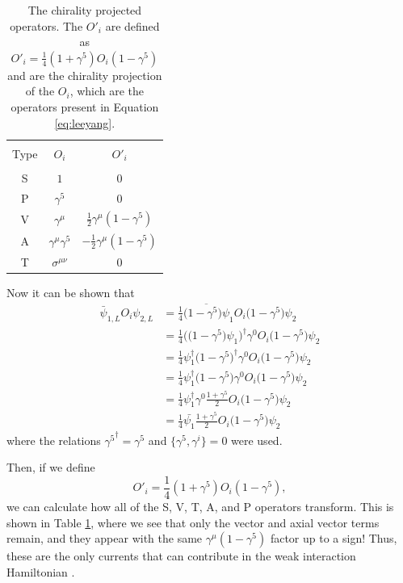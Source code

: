 \begin{table}[h]
  \caption{The chirality projected operators. The $O'_i$ are defined as $O'_i = \frac{1}{4}(1+\gamma^5) O_i (1-\gamma^5)$ and
    are the chirality projection of the $O_i$, which are the operators present in Equation
    \ref{eq:leeyang}.} 
  \centering
  \begin{tabular}{c c c }
    \hline \hline \\ [-1.75ex]
    Type & $O_i$ & $O'_i$ \\ [0.50ex]
    \hline \\ 
    S & $1$ & 0 \\ [0.50ex]
    P & $\gamma^5$ & 0 \\ [0.50ex]
    V & $\gamma^{\mu}$ & $\frac{1}{2}\gamma^\mu(1-\gamma^5)$ \\ [0.50ex]
    A & $\gamma^{\mu}\gamma^5$ & $-\frac{1}{2}\gamma^\mu(1-\gamma^5)$ \\ [0.50ex]
    T & $\sigma^{\mu\nu}$ & 0 \\ [0.50ex]   
    \hline
  \end{tabular}
  \label{tab:operatorPrime}
\end{table}

Now it can be shown that
%
\begin{align*}
  \bar{\psi}_{1,L} O_i \psi_{2,L} &= \frac{1}{4}\overline{\big(1-\gamma^5\big)\psi}_{1} O_i \big(1-\gamma^5\big)\psi_{2} \\
  &= \frac{1}{4}\Big(\big(1-\gamma^5\big)\psi_{1}\Big)^\dagger \gamma^0 O_i \big(1-\gamma^5\big)\psi_{2} \\
  &= \frac{1}{4}\psi^\dagger_{1}\big(1-\gamma^5\big)^\dagger \gamma^0 O_i \big(1-\gamma^5\big)\psi_{2} \\
  &= \frac{1}{4}\psi^\dagger_{1}\big(1-\gamma^5\big) \gamma^0 O_i \big(1-\gamma^5\big)\psi_{2} \\
  &= \frac{1}{4}\psi^\dagger_{1}\gamma^0\frac{1+\gamma^5}{2} O_i \big(1-\gamma^5\big)\psi_{2} \\
  &= \frac{1}{4}\bar{\psi_{1}}\frac{1+\gamma^5}{2} O_i \big(1-\gamma^5\big)\psi_{2} 
\end{align*}
%
where the relations ${\gamma^5}^\dagger = \gamma^5$ and $\{\gamma^5,\gamma^i\}=0$ were used.

Then, if we define
\begin{equation*}
  O'_i = \frac{1}{4}(1+\gamma^5) O_i (1-\gamma^5),
\end{equation*}
we can calculate how all of the S, V, T, A, and P operators transform. This is shown in Table
\ref{tab:operatorPrime}, where we see that only the vector and axial vector terms remain, and they
appear with the same $\gamma^\mu(1-\gamma^5)$ factor up to a sign! Thus, these are the only
currents that can contribute in the weak interaction Hamiltonian \cite{greiner1996}.



